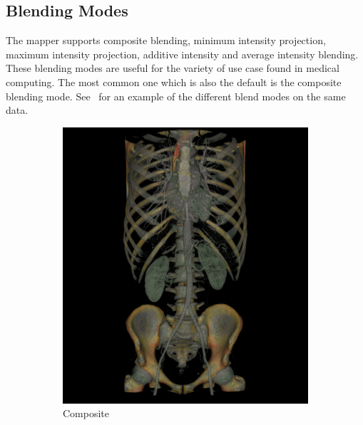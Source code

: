 \subsection{Blending Modes}
\label{blending-modes}
The mapper supports composite blending, minimum intensity projection, maximum
intensity projection, additive intensity and average intensity blending.  These
blending modes are useful for the variety of use case found in medical
computing.  The most common one which is also the default is the composite
blending mode.  See~ for an example of the different
blend modes on the same data.

\begin{figure}[htb]
  \centering%
  \begin{subfigure}{.5\columnwidth}
    \includegraphics[width=\columnwidth]{TorsoBlendingComposite}
    \caption{Composite}
    \label{fig:blendcomposite}
  \end{subfigure}%
  \begin{subfigure}{.5\columnwidth}

\end{subfigure}
\end{figure}

